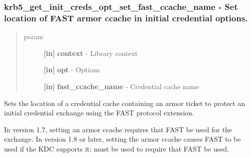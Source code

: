 \documentclass[letterpaper,10pt,english]{sphinxmanual}
\begin{document}
\subsubsection{krb5\_get\_init\_creds\_opt\_set\_fast\_ccache\_name -  Set location of FAST armor ccache in initial credential options.}
\label{appdev/refs/api/krb5_get_init_creds_opt_set_fast_ccache_name:krb5-get-init-creds-opt-set-fast-ccache-name-set-location-of-fast-armor-ccache-in-initial-credential-options}\label{appdev/refs/api/krb5_get_init_creds_opt_set_fast_ccache_name::doc}

\begin{fulllineitems}
\label{appdev/refs/api/krb5_get_init_creds_opt_set_fast_ccache_name:krb5_get_init_creds_opt_set_fast_ccache_name}
\end{fulllineitems}

\begin{quote}\begin{description}
\item[{param}] \leavevmode
\textbf{{[}in{]}} \textbf{context} - Library context

\textbf{{[}in{]}} \textbf{opt} - Options

\textbf{{[}in{]}} \textbf{fast\_ccache\_name} - Credential cache name

\end{description}\end{quote}

Sets the location of a credential cache containing an armor ticket to protect an initial credential exchange using the FAST protocol extension.

In version 1.7, setting an armor ccache requires that FAST be used for the exchange. In version 1.8 or later, setting the armor ccache causes FAST to be used if the KDC supports it; {\hyperref[appdev/refs/api/krb5_get_init_creds_opt_set_fast_flags:krb5_get_init_creds_opt_set_fast_flags]{}} must be used to require that FAST be used.
\end{document}
